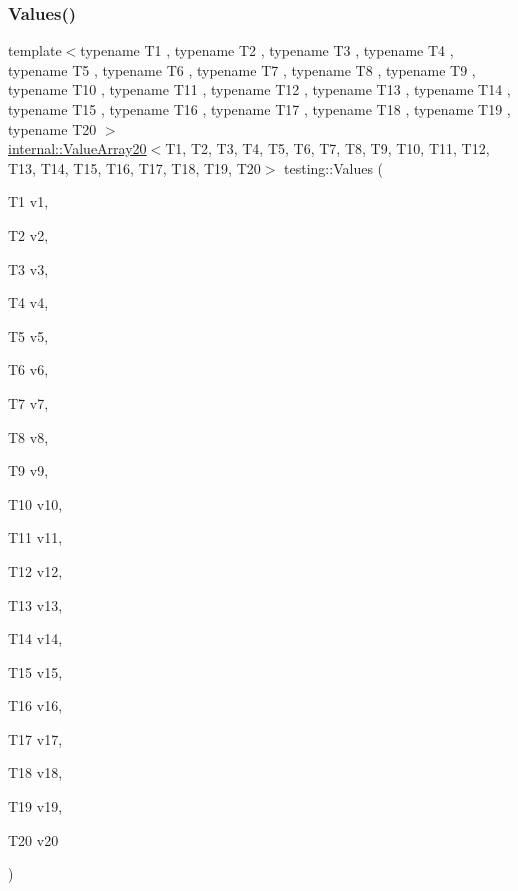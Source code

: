 \subsubsection{\texorpdfstring{Values()}{Values()}\hspace{0.1cm}{\footnotesize\ttfamily [21/51]}}
{\footnotesize\ttfamily template$<$typename T1 , typename T2 , typename T3 , typename T4 , typename T5 , typename T6 , typename T7 , typename T8 , typename T9 , typename T10 , typename T11 , typename T12 , typename T13 , typename T14 , typename T15 , typename T16 , typename T17 , typename T18 , typename T19 , typename T20 $>$ \\
\mbox{\hyperlink{classtesting_1_1internal_1_1_value_array20}{internal\+::\+Value\+Array20}}$<$T1, T2, T3, T4, T5, T6, T7, T8, T9, T10, T11, T12, T13, T14, T15, T16, T17, T18, T19, T20$>$ testing\+::\+Values (\begin{DoxyParamCaption}\item[{T1}]{v1,  }\item[{T2}]{v2,  }\item[{T3}]{v3,  }\item[{T4}]{v4,  }\item[{T5}]{v5,  }\item[{T6}]{v6,  }\item[{T7}]{v7,  }\item[{T8}]{v8,  }\item[{T9}]{v9,  }\item[{T10}]{v10,  }\item[{T11}]{v11,  }\item[{T12}]{v12,  }\item[{T13}]{v13,  }\item[{T14}]{v14,  }\item[{T15}]{v15,  }\item[{T16}]{v16,  }\item[{T17}]{v17,  }\item[{T18}]{v18,  }\item[{T19}]{v19,  }\item[{T20}]{v20 }\end{DoxyParamCaption})}

\mbox{\label{namespacetesting_a6f3b9661b48f2c663dbe5fcfb0720f5f}} 
